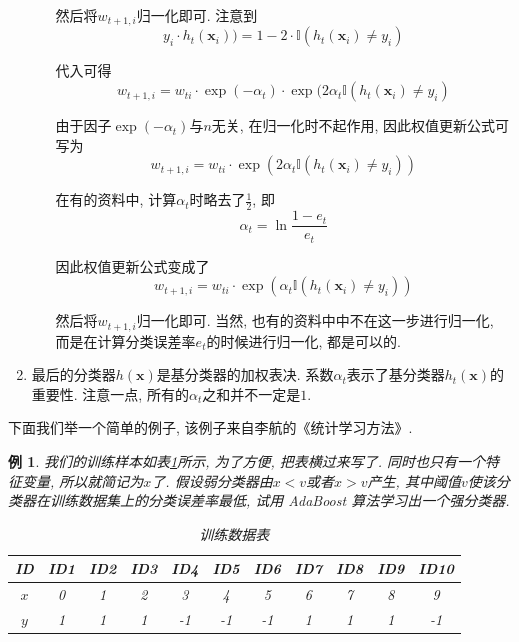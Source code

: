 \documentclass[a4paper,UTF8]{ctexart}
\theoremstyle{plain} \newtheorem{theorem}{定理}[section]
\theoremstyle{plain} \newtheorem{definition}{定义}[section]
\theoremstyle{plain} \newtheorem{lemma}{引理}[section]
\theoremstyle{plain} \newtheorem{proposition}{命题}[section]
\theoremstyle{plain} \newtheorem{example}{例}[section]
\theoremstyle{plain} \newtheorem{remark}{注}[section]
\theoremstyle{plain} \newtheorem{corollary}{推论}[section]
\begin{document}
\begin{enumerate}[(1)]
\begin{enumerate}[(a)]
然后将$w_{t+1,i}$归一化即可. 注意到
\begin{equation*}
y_{i} \cdot h_{t}(\bm{x}_i)) = 1 - 2 \cdot \mathbb{I}( h_{t}(\bm{x}_i) \neq y_{i} )
\end{equation*}

代入可得
\begin{equation*}
w_{t+1,i} = w_{ti} \cdot \exp (- \alpha_t) \cdot \exp (2 \alpha_t \mathbb{I}( h_{t}(\bm{x}_i) \neq y_{i})
\end{equation*}

由于因子$\exp(- \alpha_t)$与$n$无关, 在归一化时不起作用, 因此权值更新公式可写为
\begin{equation*}
w_{t+1,i} = w_{ti} \cdot \exp (2 \alpha_t \mathbb{I}( h_{t}(\bm{x}_i) \neq y_{i} ))
\end{equation*}

在有的资料中, 计算$\alpha_t$时略去了$\frac{1}{2}$, 即
\begin{equation*}
\alpha_t = \ln \frac{1 - e_t}{e_t}
\end{equation*}

因此权值更新公式变成了
\begin{equation*}
w_{t+1,i} = w_{ti} \cdot \exp (\alpha_t \mathbb{I}( h_{t}(\bm{x}_i) \neq y_{i} ))
\end{equation*}

然后将$w_{t+1,i}$归一化即可. 当然, 也有的资料中中不在这一步进行归一化, 而是在计算分类误差率$e_t$的时候进行归一化, 都是可以的.

\end{enumerate}

\item 最后的分类器$h(\bm{x})$是基分类器的加权表决. 系数$\alpha_t$表示了基分类器$h_{t}(\bm{x})$的重要性. 注意一点, 所有的$\alpha_t$之和并不一定是$1$. 

\end{enumerate}

下面我们举一个简单的例子, 该例子来自李航的《统计学习方法》.
\begin{example}
我们的训练样本如表\ref{simpledata}所示, 为了方便, 把表横过来写了. 同时也只有一个特征变量, 所以就简记为$x$了. 假设弱分类器由$x < v$或者$x > v$产生, 其中阈值$v$使该分类器在训练数据集上的分类误差率最低, 试用 AdaBoost 算法学习出一个强分类器.
\begin{table}[!htb]
\centering
\caption{训练数据表}
\label{simpledata}
\begin{tabular}{ccccccccccc}
  \hline
    ID & ID1 & ID2 & ID3 & ID4 & ID5 & ID6 & ID7 & ID8 & ID9 & ID10 \\ 
    \hline
    $x$ & 0 & 1 & 2 & 3 & 4 & 5 & 6 & 7 & 8 & 9 \\
    $y$ & 1 & 1 & 1 & -1 & -1 & -1 & 1 & 1 & 1 & -1 \\
  \hline
\end{tabular}
\end{table}

\end{example}
\end{document}
